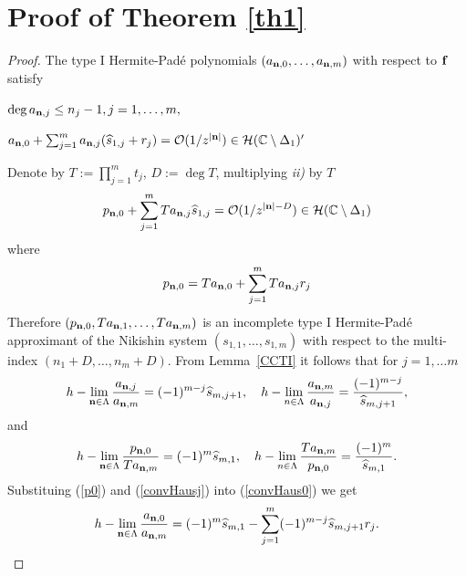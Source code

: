 \documentclass[10pt,a4paper]{article}
\theoremstyle{definition}
\theoremstyle{remark}
\numberwithin{equation}{section}
\begin{document}
\section{ Proof of  Theorem \ref{th1}}

\begin{proof}
The type I  Hermite-Pad\'e  polynomials  $\left(a_{{\bf n},0},\ldots, a_{{\bf n},m}\right)$ with respect to ${\bf f}$ satisfy
\item[i)] $\deg a_{{\bf n},j} \leq n_j -1, j=1,\ldots,m,$
\item[ii)] $a_{{\bf n},0} + \sum_{j= 1}^m a_{{\bf n},j} (\widehat{s}_{1,j}+r_j) = \mathcal{O}(1/z^{|{\bf n}|}) \in \mathcal{H}(\mathbb{C} \setminus \Delta_1)^{\prime}$

Denote by $T:=\prod_{j=1}^{m}t_j$, $D:= \deg T$, multiplying \textit{ii)} by $T$
\begin{equation}\label{imcop}
p_{{\bf n},0} + \sum_{j= 1}^m Ta_{{\bf n},j} \widehat{s}_{1,j} = \mathcal{O}(1/z^{|{\bf n}| -D}) \in \mathcal{H}(\mathbb{C} \setminus \Delta_1)
\end{equation}
where
\begin{equation}\label{p0}
p_{{\bf n},0}=Ta_{{\bf n},0}+\sum_{j= 1}^m Ta_{{\bf n},j}r_j
\end{equation}
Therefore $\left(p_{{\bf n},0},Ta_{{\bf n},1},\ldots, Ta_{{\bf n},m}\right)$ is  an incomplete type I  Hermite-Pad\'e  approximant of the Nikishin system $(s_{1,1},\ldots,s_{1,m})$ with respect to the multi-index $(n_1+D,\ldots, n_m+D)$. From Lemma~\ref{CCTI} it follows that for $j=1,\ldots m$
\begin{equation} \label{convHausj}
h-\lim_{{\bf n}\in \Lambda}\frac{a_{{\bf n}, j}}{a_{{\bf n},m}} = (-1)^{m-j}\widehat{s}_{m,j+1}, \quad h-\lim_{n\in \Lambda}\frac{a_{{\bf n}, m}}{a_{{\bf n},j}} = \frac{(-1)^{m-j}}{\widehat{s}_{m,j+1} },
\end{equation}
and
\begin{equation} \label{convHaus0}
h-\lim_{{\bf n}\in \Lambda}\frac{p_{{\bf n}, 0}}{Ta_{{\bf n},m}} = (-1)^{m}\widehat{s}_{m,1}, \quad h-\lim_{n\in \Lambda}\frac{Ta_{{\bf n}, m}}{p_{{\bf n},0}} = \frac{(-1)^{m}}{\widehat{s}_{m,1} }.
\end{equation}
Substituing (\ref{p0}) and (\ref{convHausj}) into (\ref{convHaus0}) we get
\begin{equation}\label{Ca0}
h-\lim_{{\bf n}\in \Lambda}\frac{a_{{\bf n}, 0}}{a_{{\bf n},m}} = (-1)^{m}\widehat{s}_{m,1}-\sum_{j=1}^{m}(-1)^{m-j}\widehat{s}_{m,j+1}r_j.
\end{equation}


\end{proof}
\end{document}

